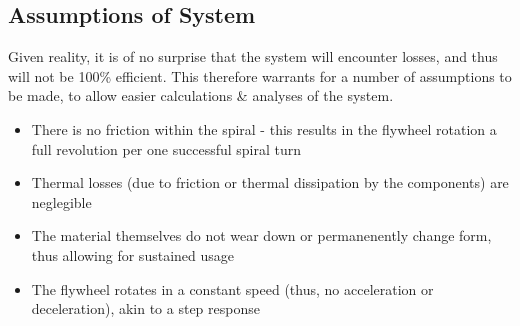 \documentclass[conference]{ieeetran}
\begin{document}


\subsection{Assumptions of System}
Given reality, it is of no surprise that the system will encounter losses, and thus will not be 100\% efficient. This therefore warrants for a number of assumptions to be made, to allow easier calculations \& analyses of the system.
\begin{itemize}
    \item There is no friction within the spiral - this results in the flywheel rotation a full revolution per one successful spiral turn
    \item Thermal losses (due to friction or thermal dissipation by the components) are neglegible
    \item The material themselves do not wear down or permanenently change form, thus allowing for sustained usage
    \item The flywheel rotates in a constant speed (thus, no acceleration or deceleration), akin to a step response
\end{itemize}
\end{document}
